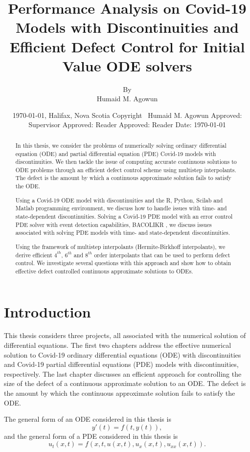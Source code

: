 \documentclass{report}
\title{Performance Analysis on Covid-19 Models with Discontinuities and Efficient Defect Control for Initial Value ODE solvers}
\author{
	By\\
	Humaid M. Agowun \\}
\date{\today, Halifax, Nova Scotia\endgraf\smallskip
	Copyright \textcopyright \ Humaid M. Agowun\endgraf\smallskip\endgraf\bigskip
	\hfill Approved: \endgraf\bigskip\endgraf\smallskip
	\endgraf\smallskip\endgraf\smallskip
	\hfill Supervisor\endgraf\smallskip\endgraf\smallskip
	\hfill Approved:  \endgraf\bigskip\endgraf\bigskip
	\endgraf\smallskip\endgraf\smallskip
	\hfill Reader\endgraf\smallskip\endgraf\smallskip
	\hfill Approved:  \endgraf\bigskip\endgraf\bigskip
	\endgraf\smallskip\endgraf\smallskip
	\hfill Reader\endgraf\smallskip\endgraf\smallskip
	\hfill Date: \today }
\begin{document}
	\thispagestyle{empty}
	\maketitle
	\thispagestyle{empty}
	
\begin{abstract}
In this thesis, we consider the problems of numerically solving ordinary differential equation (ODE) and partial differential equation (PDE) Covid-19 models with discontinuities. We then tackle the issue of computing accurate continuous solutions to ODE problems through an efficient defect control scheme using multistep interpolants. The defect is the amount by which a continuous approximate solution fails to satisfy the ODE.

Using a Covid-19 ODE model with discontinuities and the R, Python, Scilab and Matlab programming environment, we discuss how to handle issues with time- and state-dependent discontinuities. Solving a Covid-19 PDE model with an error control PDE solver with event detection capabilities, BACOLIKR \cite{bacolikr}, we discuss issues associated with solving PDE models with time- and state-dependent discontinuities. 

Using the framework of multistep interpolants (Hermite-Birkhoff interpolants), we derive efficient $4^{th}$, $6^{th}$ and $8^{th}$ order interpolants that can be used to perform defect control. We investigate several questions with this approach and show how to obtain effective defect controlled continuous approximate solutions to ODEs. 

\end{abstract}

\chapter{Introduction}
This thesis considers three projects, all associated with the numerical solution of differential equations. The first two chapters address the effective numerical solution to Covid-19 ordinary differential equations (ODE) with discontinuities and Covid-19 partial differential equations (PDE) models with discontinuities, respectively. The last chapter discusses an efficient approach for controlling the size of the defect of a continuous approximate solution to an ODE. The defect is the amount by which the continuous approximate solution fails to satisfy the ODE. 

The general form of an ODE considered in this thesis is 
\begin{equation}
y'(t) = f(t, y(t)),
\end{equation}
and the general form of a PDE considered in this thesis is 
\begin{equation}
u_t(x, t) = f(x, t, u(x,t), u_x(x,t), u_{xx}(x,t)).
\end{equation}
\end{document}
